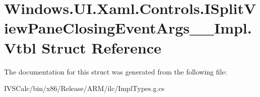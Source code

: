 \hypertarget{struct_windows_1_1_u_i_1_1_xaml_1_1_controls_1_1_i_split_view_pane_closing_event_args_____impl_1_1_vtbl}{}\section{Windows.\+U\+I.\+Xaml.\+Controls.\+I\+Split\+View\+Pane\+Closing\+Event\+Args\+\_\+\+\_\+\+Impl.\+Vtbl Struct Reference}
\label{struct_windows_1_1_u_i_1_1_xaml_1_1_controls_1_1_i_split_view_pane_closing_event_args_____impl_1_1_vtbl}


The documentation for this struct was generated from the following file\+:\begin{DoxyCompactItemize}
\item 
I\+V\+S\+Calc/bin/x86/\+Release/\+A\+R\+M/ilc/Impl\+Types.\+g.\+cs\end{DoxyCompactItemize}
